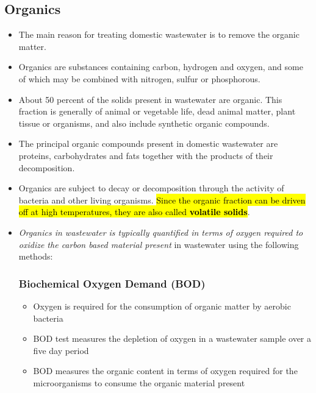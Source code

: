 		\subsection{Organics}		
		\begin{itemize}
			\item The main reason for treating domestic wastewater is to remove the organic matter.  
			\item Organics are substances containing carbon, hydrogen and oxygen, and some of which may be combined with nitrogen, sulfur or phosphorous.
			\item About 50 percent of the solids present in wastewater are organic.  This fraction is generally of animal or vegetable life, dead animal matter, plant tissue or organisms, and also include synthetic organic compounds.
			\item The principal organic compounds present in domestic wastewater are proteins, carbohydrates and fats together with the products of their decomposition.
			\item Organics are subject to decay or decomposition through the activity of bacteria and other living organisms.  \hl{Since the organic fraction can be driven off at high temperatures, they are also called \textbf{volatile solids}}.\
			\item \emph{Organics in wastewater is typically quantified in terms of oxygen required to oxidize the carbon based material present} in wastewater using the following methods:\\
\subsubsection{Biochemical Oxygen Demand (BOD)}\index{Biochemical Oxygen Demand (BOD)}

			      	\begin{itemize}
			      		\item Oxygen is required for the consumption of organic matter by aerobic bacteria
			      		\item BOD test measures the depletion of oxygen in a wastewater sample over a five day period
			      		\item BOD measures the organic content in terms of oxygen required for the microorganisms to consume the organic material present


\end{itemize}
\end{itemize}
